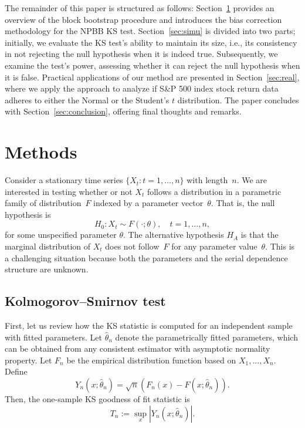 \documentclass[APA,Times1COL]{WileyNJDv5} %
\begin{document}
The remainder of this paper is structured as follows: 
Section~\ref{sec:methods} provides an overview of the block bootstrap 
procedure and introduces the bias correction methodology for the 
NPBB KS test. Section~\ref{sec:simu} is divided 
into two parts; initially, we evaluate the KS test's ability to maintain 
its size, i.e., its consistency in not rejecting the null hypothesis when 
it is indeed true. Subsequently, we examine the test's power, assessing 
whether it can reject the null hypothesis when it is false. Practical 
applications of our method are presented in Section~\ref{sec:real}, where 
we apply the approach to analyze if S\&P 500 index stock return
data adheres to either the Normal or the Student's $t$ distribution. The 
paper concludes with Section~\ref{sec:conclusion}, offering final thoughts
and remarks.


\section{Methods}\label{sec:methods}

Consider a stationary time series $\{X_t: t = 1, \ldots, n\}$ with length~$n$.
We are interested in testing whether or not $X_t$ follows a distribution in a
parametric family of distribution~$F$ indexed by a parameter
vector~$\theta$. That is, the null hypothesis is
\[
  H_0: X_t \sim F(\cdot ; \theta), \quad t = 1, \ldots, n,
\]
for some unspecified parameter $\theta$.
The alternative hypothesis $H_A$ is that the marginal distribution of $X_t$ does
not follow~$F$ for any parameter value~$\theta$. This is a challenging situation
because both the parameters and the serial dependence structure are unknown.

\subsection{Kolmogorov--Smirnov test}

First, let us review how the KS statistic is computed for an independent
sample with fitted parameters. Let $\hat\theta_n$ denote the parametrically
fitted parameters, which can be obtained from any consistent estimator with
asymptotic normality property.  Let $F_n$ be the empirical distribution
function based on $X_1,...,X_n$.
Define 
\begin{equation*}
Y_n(x; \hat\theta_n) = \sqrt{n}(F_n(x) - F(x; \hat\theta_n)).
\end{equation*}
Then, the one-sample KS goodness of fit statistic is 
\begin{equation*}
T_n := \sup_x|Y_n(x; \hat\theta_n)|.
\end{equation*}
\end{document}
